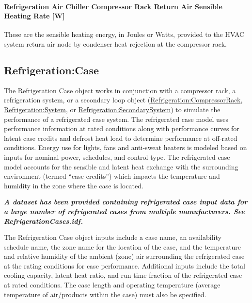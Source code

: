 \paragraph{Refrigeration Air Chiller Compressor Rack Return Air Sensible Heating Rate {[}W{]}}\label{refrigeration-air-chiller-compressor-rack-return-air-sensible-heating-rate-w}

These are the sensible heating energy, in Joules or Watts, provided to the HVAC system return air node by condenser heat rejection at the compressor rack.

\subsection{Refrigeration:Case}\label{refrigerationcase}

The Refrigeration Case object works in conjunction with a compressor rack, a refrigeration system, or a secondary loop object (\hyperref[refrigerationcompressorrack]{Refrigeration:CompressorRack}, \hyperref[refrigerationsystem]{Refrigeration:System}, or \hyperref[refrigerationsecondarysystem]{Refrigeration:SecondarySystem}) to simulate the performance of a refrigerated case system. The refrigerated case model uses performance information at rated conditions along with performance curves for latent case credits and defrost heat load to determine performance at off-rated conditions. Energy use for lights, fans and anti-sweat heaters is modeled based on inputs for nominal power, schedules, and control type. The refrigerated case model accounts for the sensible and latent heat exchange with the surrounding environment (termed ``case credits'') which impacts the temperature and humidity in the zone where the case is located.

\textbf{\emph{A dataset has been provided containing refrigerated case input data for a large number of refrigerated cases from multiple manufacturers. See RefrigerationCases.idf.}}

The Refrigeration Case object inputs include a case name, an availability schedule name, the zone name for the location of the case, and the temperature and relative humidity of the ambient (zone) air surrounding the refrigerated case at the rating conditions for case performance. Additional inputs include the total cooling capacity, latent heat ratio, and run time fraction of the refrigerated case at rated conditions. The case length and operating temperature (average temperature of air/products within the case) must also be specified.

